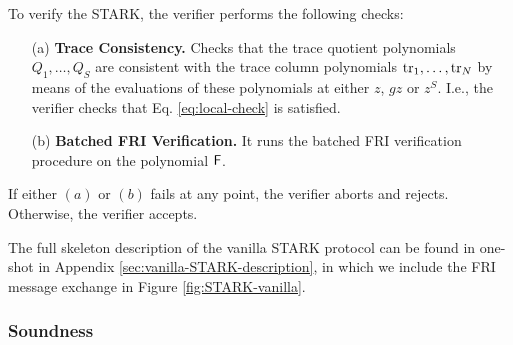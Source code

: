 To verify the STARK, the verifier performs the following checks:
\begin{enumerate}
  \item[(a)] \textbf{Trace Consistency.} Checks that the trace quotient polynomials $Q_1, \dots, Q_S$ are consistent with the trace column polynomials $\text{tr}_1, \dots, \text{tr}_N$ by means of the evaluations of these polynomials at either $z$, $gz$ or $z^S$. I.e., the verifier checks that Eq. \eqref{eq:local-check} is satisfied. 
  
  \item[(b)] \textbf{Batched FRI Verification.} It runs the batched FRI verification procedure on the polynomial $\textsf{F}$.

  
\end{enumerate}
If either $(a)$ or $(b)$ fails at any point, the verifier aborts and rejects. Otherwise, the verifier accepts.

The full skeleton description of the vanilla STARK protocol can be found in one-shot in Appendix \ref{sec:vanilla-STARK-description}, in which we include the FRI message exchange in Figure \ref{fig:STARK-vanilla}.

\subsubsection*{Soundness}

